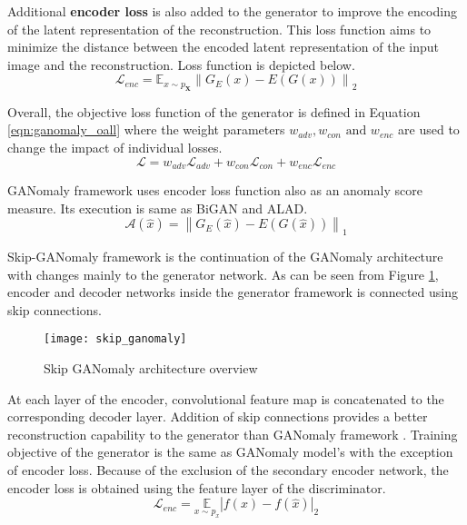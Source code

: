 {Additional \textbf{encoder loss} is also added to the generator to improve the encoding of the latent
representation of the reconstruction. This loss function aims to minimize the distance between the
encoded latent representation of the input image and the reconstruction. Loss function is
depicted below.
\begin{equation}
    \mathcal{L}_{e n c}=\mathbb{E}_{x \sim p_{\mathbf{X}}}\left\|G_{E}(x)-E(G(x))\right\|_{2} 
\end{equation}

Overall, the objective loss function of the generator is defined in Equation
\ref{eqn:ganomaly_oall} where the weight parameters $w_{adv}, w_{con} \text { and } w_{enc}$
are used to change the impact of individual losses.
\begin{equation}
    \label{eqn:ganomaly_oall}
    \mathcal{L}=w_{a d v} \mathcal{L}_{a d v}+w_{c o n} \mathcal{L}_{c o n}+w_{e n c} \mathcal{L}_{e n c} 
\end{equation}

GANomaly framework uses encoder loss function also as an anomaly score measure. Its execution is same 
as BiGAN and ALAD. 
\begin{equation}
\label{eqn:ganomaly_as}
    \mathcal{A}(\hat{x})=\left\|G_{E}(\hat{x})-E(G(\hat{x}))\right\|_{1}  
\end{equation}

Skip-GANomaly framework\cite{Akay2019SkipGANomalySC} is the continuation of the GANomaly architecture with changes mainly to the
generator network. As can be seen from Figure \ref{fig:sganomaly_model}, encoder and decoder
networks inside the generator framework is connected using skip connections. 
\begin{figure}[h!]
	\centering
	\texttt{[image: skip\_ganomaly]}
    \caption{Skip GANomaly architecture overview \cite{Akay2019SkipGANomalySC}}
    \label{fig:sganomaly_model}
\end{figure}

At each layer of the encoder, convolutional feature map is concatenated to the corresponding decoder
layer. Addition of skip connections provides a better reconstruction capability to the generator
than GANomaly framework \cite{Akay2018GANomalySA}. Training objective of the generator is the same as 
GANomaly model's with the exception of encoder loss. Because of the exclusion of the secondary 
encoder network, the encoder loss is obtained using the feature layer of the discriminator. 
\begin{equation}
    \mathcal{L}_{enc}=\underset{x \sim p_{x}}{\mathbb{E}}|f(x)-f(\hat{x})|_{2}  
\end{equation}

}
